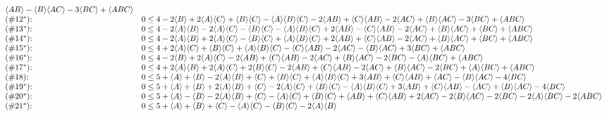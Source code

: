 \documentclass[aps,english,superscriptaddress,onecolumn,twoside,longbibliography,pra,floatfix,fleqn,nofootinbib]{revtex4-1}%
\theoremstyle{definition}
\DeclarePairedDelimiter{\expec}{\langle}{\rangle}
\begin{document}
\begin{align*}
{\begin{array}{ll}
   \expec{AB}-\expec{B} \expec{AC}-3 \expec{BC}+\expec{ABC} \\
 \text{($\#$} 12^* \text{):  } & 0\leq 4-2 \expec{B}+2 \expec{A} \expec{C}+\expec{B} \expec{C}-\expec{A} \expec{B} \expec{C}-2
   \expec{AB}+\expec{C} \expec{AB}-2 \expec{AC}+\expec{B} \expec{AC}-3 \expec{BC}+\expec{ABC} \\
 \text{($\#$} 13^* \text{):  } & 0\leq 4-2 \expec{A} \expec{B}-2 \expec{A} \expec{C}-\expec{B} \expec{C}-\expec{A} \expec{B}
   \expec{C}+2 \expec{AB}-\expec{C} \expec{AB}-2 \expec{AC}+\expec{B} \expec{AC}+\expec{BC}+\expec{ABC} \\
 \text{($\#$} 14^* \text{):  } & 0\leq 4-2 \expec{A} \expec{B}+2 \expec{A} \expec{C}-\expec{B} \expec{C}+\expec{A} \expec{B}
   \expec{C}+2 \expec{AB}+\expec{C} \expec{AB}-2 \expec{AC}+\expec{B} \expec{AC}+\expec{BC}+\expec{ABC} \\
 \text{($\#$} 15^* \text{):  } & 0\leq 4+2 \expec{A} \expec{C}+\expec{B} \expec{C}+\expec{A} \expec{B} \expec{C}-\expec{C} \expec{AB}-2
   \expec{AC}-\expec{B} \expec{AC}+3 \expec{BC}+\expec{ABC} \\
 \text{($\#$} 16^* \text{):  } & 0\leq 4-2 \expec{B}+2 \expec{A} \expec{C}-2 \expec{AB}+\expec{C} \expec{AB}-2 \expec{AC}+\expec{B}
   \expec{AC}-2 \expec{BC}-\expec{A} \expec{BC}+\expec{ABC} \\
 \text{($\#$} 17^* \text{):  } & 0\leq 4+2 \expec{A} \expec{B}+2 \expec{A} \expec{C}+2 \expec{B} \expec{C}-2 \expec{AB}+\expec{C}
   \expec{AB}-2 \expec{AC}+\expec{B} \expec{AC}-2 \expec{BC}+\expec{A} \expec{BC}+\expec{ABC} \\
 \text{($\#$} 18 \text{):  } & 0\leq 5+\expec{A}+\expec{B}-2 \expec{A} \expec{B}+\expec{C}+\expec{B} \expec{C}+\expec{A} \expec{B}
   \expec{C}+3 \expec{AB}+\expec{C} \expec{AB}+\expec{AC}-\expec{B} \expec{AC}-4 \expec{BC} \\
 \text{($\#$} 19^* \text{):  } & 0\leq 5+\expec{A}+\expec{B}+2 \expec{A} \expec{B}+\expec{C}-2 \expec{A} \expec{C}+\expec{B}
   \expec{C}-\expec{A} \expec{B} \expec{C}+3 \expec{AB}+\expec{C} \expec{AB}-\expec{AC}+\expec{B} \expec{AC}-4 \expec{BC} \\
 \text{($\#$} 20^* \text{):  } & 0\leq 5+\expec{A}-\expec{B}-2 \expec{A} \expec{B}+\expec{C}-\expec{A} \expec{C}+\expec{B}
   \expec{C}+\expec{AB}+\expec{C} \expec{AB}+2 \expec{AC}-2 \expec{B} \expec{AC}-2 \expec{BC}-2 \expec{A} \expec{BC}-2 \expec{ABC} \\
 \text{($\#$} 21^* \text{):  } & 0\leq 5+\expec{A}+\expec{B}+\expec{C}-\expec{A} \expec{C}-\expec{B} \expec{C}-2 \expec{A} \expec{B}

\end{array}}
\end{align*}
\end{document}
